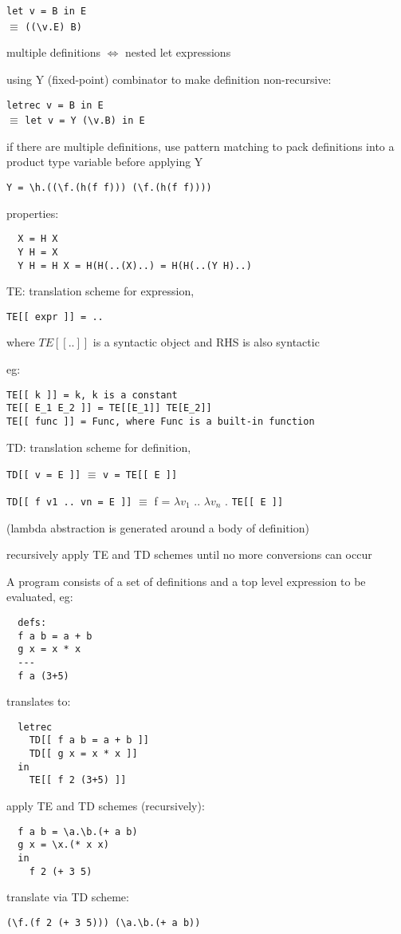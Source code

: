 \documentclass[8pt]{extarticle}
\begin{document}
\begin{multicols*}{2}
  \verb|let v = B in E|\\
  $\equiv$ \verb|((\v.E) B)|
  
  multiple definitions $\iff$ nested let expressions

  using Y (fixed-point) combinator to make definition non-recursive:
  
  \verb|letrec v = B in E|\\
  $\equiv$ \verb|let v = Y (\v.B) in E|

  if there are multiple definitions, use pattern matching to pack definitions into a product type variable before applying Y

  \verb|Y = \h.((\f.(h(f f))) (\f.(h(f f))))|
  
  properties:
\begin{verbatim}
  X = H X
  Y H = X
  Y H = H X = H(H(..(X)..) = H(H(..(Y H)..)
\end{verbatim}
  
  TE: translation scheme for expression,
\begin{verbatim}
TE[[ expr ]] = ..
\end{verbatim}
  where $TE[[..]]$ is a syntactic object and RHS is also syntactic

  eg:
\begin{verbatim}
TE[[ k ]] = k, k is a constant
TE[[ E_1 E_2 ]] = TE[[E_1]] TE[E_2]]
TE[[ func ]] = Func, where Func is a built-in function
\end{verbatim}

  TD: translation scheme for definition,

  \verb|TD[[ v = E ]]| $\equiv$ \verb|v = TE[[ E ]]|
  
  \verb|TD[[ f v1 .. vn = E ]]| $\equiv$ f = $\lambda v_1$ .. $\lambda v_n$ . \verb|TE[[ E ]]|

  (lambda abstraction is generated around a body of definition)

  recursively apply TE and TD schemes until no more conversions can occur

  A program consists of a set of definitions and a top level expression to be evaluated, eg:
\begin{verbatim}
  defs:
  f a b = a + b
  g x = x * x
  ---
  f a (3+5)
\end{verbatim}
  translates to:
\begin{verbatim}
  letrec
    TD[[ f a b = a + b ]]
    TD[[ g x = x * x ]]
  in
    TE[[ f 2 (3+5) ]]
\end{verbatim}
  apply TE and TD schemes (recursively):
\begin{verbatim}
  f a b = \a.\b.(+ a b)
  g x = \x.(* x x)
  in
    f 2 (+ 3 5)
\end{verbatim}
  translate via TD scheme:
\begin{verbatim}
(\f.(f 2 (+ 3 5))) (\a.\b.(+ a b))
\end{verbatim}


\end{multicols*}
\end{document}
